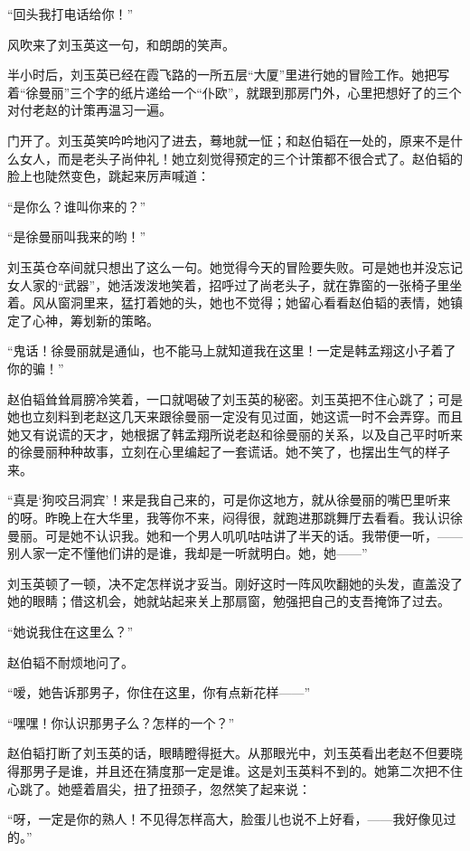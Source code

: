 \par “回头我打电话给你！”
\par 风吹来了刘玉英这一句，和朗朗的笑声。
\par 半小时后，刘玉英已经在霞飞路的一所五层“大厦”里进行她的冒险工作。她把写着“徐曼丽”三个字的纸片递给一个“仆欧”，就跟到那房门外，心里把想好了的三个对付老赵的计策再温习一遍。
\par 门开了。刘玉英笑吟吟地闪了进去，蓦地就一怔；和赵伯韬在一处的，原来不是什么女人，而是老头子尚仲礼！她立刻觉得预定的三个计策都不很合式了。赵伯韬的脸上也陡然变色，跳起来厉声喊道：
\par “是你么？谁叫你来的？”
\par “是徐曼丽叫我来的哟！”
\par 刘玉英仓卒间就只想出了这么一句。她觉得今天的冒险要失败。可是她也并没忘记女人家的“武器”，她活泼泼地笑着，招呼过了尚老头子，就在靠窗的一张椅子里坐着。风从窗洞里来，猛打着她的头，她也不觉得；她留心看看赵伯韬的表情，她镇定了心神，筹划新的策略。
\par “鬼话！徐曼丽就是通仙，也不能马上就知道我在这里！一定是韩孟翔这小子着了你的骗！”
\par 赵伯韬耸耸肩膀冷笑着，一口就喝破了刘玉英的秘密。刘玉英把不住心跳了；可是她也立刻料到老赵这几天来跟徐曼丽一定没有见过面，她这谎一时不会弄穿。而且她又有说谎的天才，她根据了韩孟翔所说老赵和徐曼丽的关系，以及自己平时听来的徐曼丽种种故事，立刻在心里编起了一套谎话。她不笑了，也摆出生气的样子来。
\par “真是‘狗咬吕洞宾’！来是我自己来的，可是你这地方，就从徐曼丽的嘴巴里听来的呀。昨晚上在大华里，我等你不来，闷得很，就跑进那跳舞厅去看看。我认识徐曼丽。可是她不认识我。她和一个男人叽叽咕咕讲了半天的话。我带便一听，——别人家一定不懂他们讲的是谁，我却是一听就明白。她，她——”
\par 刘玉英顿了一顿，决不定怎样说才妥当。刚好这时一阵风吹翻她的头发，直盖没了她的眼睛；借这机会，她就站起来关上那扇窗，勉强把自己的支吾掩饰了过去。
\par “她说我住在这里么？”
\par 赵伯韬不耐烦地问了。
\par “嗳，她告诉那男子，你住在这里，你有点新花样——”
\par “嘿嘿！你认识那男子么？怎样的一个？”
\par 赵伯韬打断了刘玉英的话，眼睛瞪得挺大。从那眼光中，刘玉英看出老赵不但要晓得那男子是谁，并且还在猜度那一定是谁。这是刘玉英料不到的。她第二次把不住心跳了。她蹙着眉尖，扭了扭颈子，忽然笑了起来说：
\par “呀，一定是你的熟人！不见得怎样高大，脸蛋儿也说不上好看，——我好像见过的。”

